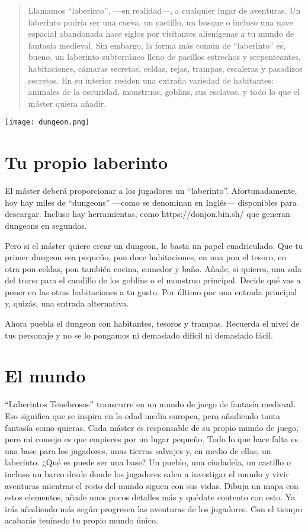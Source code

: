 \begin{abstract}
Llamamos \enquote{laberinto}, ---en realidad---, a cualquier lugar de aventuras.
Un laberinto podría ser una cueva, un castillo, un bosque o incluso una nave
espacial abandonada hace siglos por visitantes alienígenas a tu mundo de fantasía
medieval. Sin embargo, la forma más común de \enquote{laberinto} es, bueno, un
laberinto subterráneo lleno de pasillos estrechos y serpenteantes, habitaciones,
cámaras secretas, celdas, rejas, trampas, escaleras y pasadizos secretos. En su
interior residen una extraña variedad de habitantes: animales de la oscuridad,
monstruos, goblins, sus esclavos, y todo lo que el máster quiera añadir.
\end{abstract}
\vspace{1cm}
\begin{multicols}{2}

\texttt{[image: dungeon.png]}

\section{Tu propio laberinto}

El máster deberá proporcionar a los jugadores un \enquote{laberinto}. Afortunadamente,
hoy hay miles de \enquote{dungeons} ---como se denominan en Inglés--- disponibles
para descargar. Incluso hay herramientas, como https://donjon.bin.sh/ que generan
dungeons en segundos.

Pero si el máster quiere crear un dungeon, le basta un papel cuadriculado. Que
tu primer dungeon sea pequeño, pon doce habitaciones, en una pon el tesoro, en
otra pon celdas, pon también cocina, comedor y baño. Añade, si quieres, una sala
del trono para el caudillo de los goblins o el monstruo principal. Decide qué vas
a poner en las otras habitaciones a tu gusto. Por último por una entrada principal y,
quizás, una entrada alternativa.

Ahora puebla el dungeon con habitantes, tesoros y trampas. Recuerda el nivel de tus personaje y no
se lo pongamos ni demasiado difícil ni demasiado fácil.



\section{El mundo}

\enquote{Laberintos Tenebrosos} transcurre en un mundo de juego de fantasía medieval.
Eso significa que se inspira en la edad media europea, pero añadiendo tanta fantasía
como quieras. Cada máster es responsable de su propio mundo de juego, pero mi consejo
es que empieces por un lugar pequeño. Todo lo que hace falta es una base para los
jugadores, unas tierras salvajes y, en medio de ellas, un laberinto. ¿Qué es puede
ser una base? Un pueblo, una ciudadela, un castillo o incluso un barco desde donde
los jugadores salen a investigar el mundo y vivir aventuras mientras el resto del
mundo siguen con sus vidas. Dibuja un mapa con estos elementos, añade unos pocos
detalles más y quédate contento con esto. Ya irás añadiendo más según progresen
las aventuras de los jugadores. Con el tiempo acabarás teninedo tu propio mundo
único.


\end{multicols}
